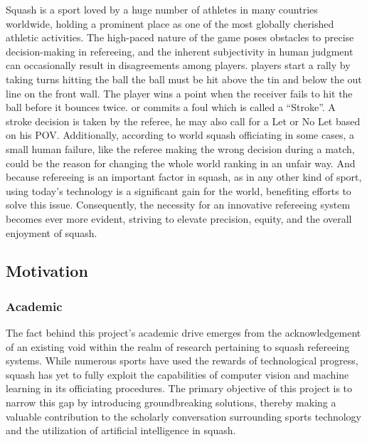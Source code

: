 \documentclass[12pt]{article}
\begin{document}
Squash is a sport loved by a huge number of athletes in many countries worldwide, holding a prominent place as one of the most globally cherished athletic activities. The high-paced nature of the game poses obstacles to precise decision-making in refereeing, and the inherent subjectivity in human judgment can occasionally result in disagreements among players. players start a rally by taking turns hitting the ball the ball must be hit above the tin and below the out line on the front wall. The player wins a point when the receiver fails to hit the ball before it bounces twice. or commits a foul which is called a “Stroke”. A stroke decision is taken by the referee, he may also call for a Let or No Let based on his POV. Additionally, according to world squash officiating \cite{world-squash-officiating} in some cases, a small human failure, like the referee making the wrong decision during a match, could be the reason for changing the whole world ranking in an unfair way. And because refereeing is an important factor in squash, as in any other kind of sport, using today’s technology is a significant gain for the world, benefiting efforts to solve this issue. Consequently, the necessity for an innovative refereeing system becomes ever more evident, striving to elevate precision, equity, and the overall enjoyment of squash.
\subsection{Motivation}

\subsubsection{Academic}
The fact behind this project's academic drive emerges from the acknowledgement of an existing void within the realm of research pertaining to squash refereeing systems. While numerous sports have used the rewards of technological progress, squash has yet to fully exploit the capabilities of computer vision and machine learning in its officiating procedures. The primary objective of this project is to narrow this gap by introducing groundbreaking solutions, thereby making a valuable contribution to the scholarly conversation surrounding sports technology and the utilization of artificial intelligence in squash.
\end{document}
